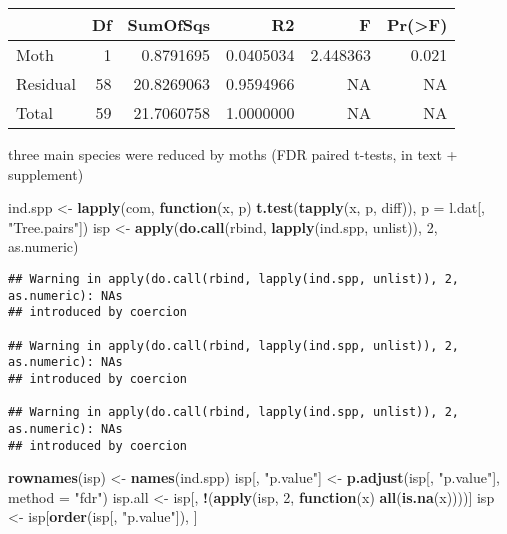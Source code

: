 \documentclass[]{article}
\newenvironment{Shaded}{\begin{snugshade}}{\end{snugshade}}
\newcommand{\KeywordTok}[1]{\textcolor[rgb]{0.13,0.29,0.53}{\textbf{#1}}}
\newcommand{\DataTypeTok}[1]{\textcolor[rgb]{0.13,0.29,0.53}{#1}}
\newcommand{\DecValTok}[1]{\textcolor[rgb]{0.00,0.00,0.81}{#1}}
\newcommand{\StringTok}[1]{\textcolor[rgb]{0.31,0.60,0.02}{#1}}
\newcommand{\ControlFlowTok}[1]{\textcolor[rgb]{0.13,0.29,0.53}{\textbf{#1}}}
\newcommand{\OperatorTok}[1]{\textcolor[rgb]{0.81,0.36,0.00}{\textbf{#1}}}
\newcommand{\NormalTok}[1]{#1}
\begin{document}
\begin{longtable}[]{@{}lrrrrr@{}}
\toprule
& Df & SumOfSqs & R2 & F & Pr(\textgreater{}F)\tabularnewline
\midrule
\endhead
Moth & 1 & 0.8791695 & 0.0405034 & 2.448363 & 0.021\tabularnewline
Residual & 58 & 20.8269063 & 0.9594966 & NA & NA\tabularnewline
Total & 59 & 21.7060758 & 1.0000000 & NA & NA\tabularnewline
\bottomrule
\end{longtable}

three main species were reduced by moths (FDR paired t-tests, in text +
supplement)

\begin{Shaded}
\begin{Highlighting}[]
\NormalTok{ind.spp <-}\StringTok{ }\KeywordTok{lapply}\NormalTok{(com, }\ControlFlowTok{function}\NormalTok{(x, p) }\KeywordTok{t.test}\NormalTok{(}\KeywordTok{tapply}\NormalTok{(x, p, diff)), }\DataTypeTok{p =}\NormalTok{ l.dat[, }\StringTok{"Tree.pairs"}\NormalTok{])}
\NormalTok{isp <-}\StringTok{ }\KeywordTok{apply}\NormalTok{(}\KeywordTok{do.call}\NormalTok{(rbind, }\KeywordTok{lapply}\NormalTok{(ind.spp, unlist)), }\DecValTok{2}\NormalTok{, as.numeric)}
\end{Highlighting}
\end{Shaded}

\begin{verbatim}
## Warning in apply(do.call(rbind, lapply(ind.spp, unlist)), 2, as.numeric): NAs
## introduced by coercion

## Warning in apply(do.call(rbind, lapply(ind.spp, unlist)), 2, as.numeric): NAs
## introduced by coercion

## Warning in apply(do.call(rbind, lapply(ind.spp, unlist)), 2, as.numeric): NAs
## introduced by coercion
\end{verbatim}

\begin{Shaded}
\begin{Highlighting}[]
\KeywordTok{rownames}\NormalTok{(isp) <-}\StringTok{ }\KeywordTok{names}\NormalTok{(ind.spp)}
\NormalTok{isp[, }\StringTok{"p.value"}\NormalTok{] <-}\StringTok{ }\KeywordTok{p.adjust}\NormalTok{(isp[, }\StringTok{"p.value"}\NormalTok{], }\DataTypeTok{method =} \StringTok{"fdr"}\NormalTok{)}
\NormalTok{isp.all <-}\StringTok{ }\NormalTok{isp[, }\OperatorTok{!}\NormalTok{(}\KeywordTok{apply}\NormalTok{(isp, }\DecValTok{2}\NormalTok{, }\ControlFlowTok{function}\NormalTok{(x) }\KeywordTok{all}\NormalTok{(}\KeywordTok{is.na}\NormalTok{(x))))]}
\NormalTok{isp <-}\StringTok{ }\NormalTok{isp[}\KeywordTok{order}\NormalTok{(isp[, }\StringTok{"p.value"}\NormalTok{]), ]}
\end{Highlighting}
\end{Shaded}
\end{document}
